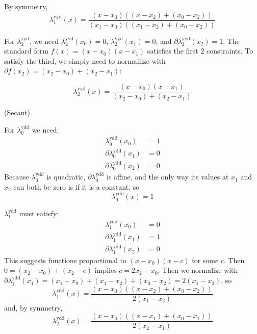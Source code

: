 By symmetry, 
\begin{equation}
\lambda^{\text{yyd}}_1(x) = 
\frac 
{(x - x_0) \left( (x - x_2) + (x_0 - x_2) \right)} 
{(x_1 - x_0) \left( (x_1 - x_2) + (x_0 - x_2) \right)}
\end{equation}

 For $\lambda^{\text{yyd}}_2$, we need 
$\lambda^{\text{yyd}}_2(x_0) = 0$, 
$\lambda^{\text{yyd}}_2(x_1) = 0$, and
$\partial\lambda^{\text{yyd}}_2(x_2) = 1$. 
The standard form $f(x) = (x-x_0) (x-x_1)$ satisfies the first 
$2$ constraints. 
To satisfy the third, we simply need to normailize with
$\partial{f}(x_2) = (x_2 - x_0) + (x_2 - x_1)$:

\begin{equation}
\lambda^{\text{yyd}}_2(x) = 
\frac 
{(x - x_0) (x - x_1)} 
{(x_2 - x_0) + (x_2 - x_1)}
\end{equation}

\label{sec:lagrange-ydd}

(Secant)

For $\lambda^{\text{ydd}}_0$ we need:
\begin{align}
\lambda^{\text{ydd}}_0(x_0) & = 1 \\
\partial\lambda^{\text{ydd}}_0(x_1) & = 0 \nonumber \\
\partial\lambda^{\text{ydd}}_0(x_2) & = 0 \nonumber
\end{align}
Because $\lambda^{\text{ydd}}_0$ is quadratic,
$\partial\lambda^{\text{ydd}}_0$ is affine, 
and the only way its values
at $x_1$ and $x_2$ can both be zero is if it is a constant, so 
\begin{equation}
\lambda^{\text{ydd}}_0(x) = 1
\end{equation}

$\lambda^{\text{ydd}}_1$ must satisfy:
\begin{align}
\lambda^{\text{ydd}}_1(x_0) & = 0 \\
\partial\lambda^{\text{ydd}}_1(x_1) & = 1 \nonumber \\
\partial\lambda^{\text{ydd}}_1(x_2) & = 0 \nonumber
\end{align}
This suggests functions proportional to $(x - x_0) (x - c)$ 
for some $c$. Then 
$ 0 = (x_2 - x_0) + (x_2 - c)$
implies $ c = 2 x_2 - x_0$.
Then we normalize with 
$\partial\lambda^{\text{ydd}}_1(x_1) = (x_1 - x_0) + (x_1 - x_2) + (x_0 - x_2) 
= 2 (x_1 - x_2)$, so 
\begin{equation}
\lambda^{\text{ydd}}_1(x) = 
\frac {(x - x_0) \left((x - x_2) + (x_0 - x_2)\right)} 
{2 (x_1 - x_2)}
\end{equation}
and, by symmetry,
\begin{equation}
\lambda^{\text{ydd}}_2(x) = 
\frac {(x - x_0) \left( (x -x_1) + (x_0 - x_1) \right)} 
{2 (x_2 - x_1)}
\end{equation}

